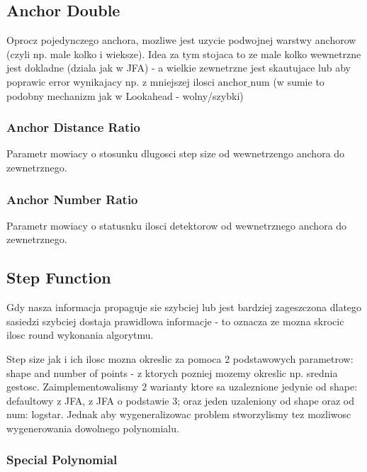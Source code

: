 \documentclass[format=acmsmall,screen,review,authordraft,nonacm]{acmart}
\begin{document}
\subsection{Anchor Double} %

Oprocz pojedynczego anchora, mozliwe jest uzycie podwojnej warstwy anchorow
(czyli np. male kolko i wieksze). Idea za tym stojaca to ze male kolko
wewnetrzne jest dokladne (dziala jak w JFA) - a wielkie zewnetrzne
jest skautujace lub aby poprawic error wynikajacy np. z mniejszej ilosci
$\text{anchor\_num}$ (w sumie to podobny mechanizm jak w Lookahead - wolny/szybki)

\subsubsection{Anchor Distance Ratio}

Parametr mowiacy o stosunku dlugosci step size od wewnetrzengo anchora do
zewnetrznego.

\subsubsection{Anchor Number Ratio}

Parametr mowiacy o statusnku ilosci detektorow od wewnetrznego anchora do
zewnetrznego.

\subsection{Step Function} %

Gdy nasza informacja propaguje sie szybciej lub jest bardziej zageszczona
dlatego sasiedzi szybciej dostaja prawidlowa informacje - to oznacza ze mozna
skrocic ilosc round wykonania algorytmu.

Step size jak i ich ilosc mozna okreslic za pomoca 2 podstawowych parametrow:
shape and number of points - z ktorych pozniej mozemy okreslic np. srednia
gestosc. Zaimplementowalismy 2 warianty ktore sa uzaleznione jedynie od shape:
defaultowy z JFA, z JFA o podstawie 3; oraz jeden uzaleniony od shape oraz od num: logstar.
Jednak aby wygeneralizowac problem stworzylismy tez mozliwosc wygenerowania
dowolnego polynomialu.

\subsubsection{Special Polynomial}
\end{document}
